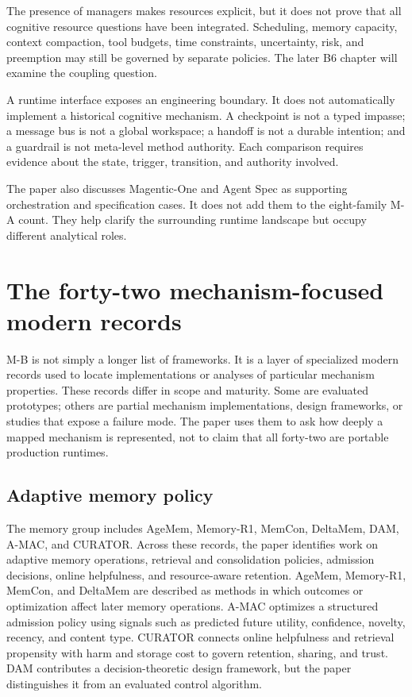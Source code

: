 The presence of managers makes resources explicit, but it does not prove that all cognitive resource questions have been integrated. Scheduling, memory capacity, context compaction, tool budgets, time constraints, uncertainty, risk, and preemption may still be governed by separate policies. The later B6 chapter will examine the coupling question.

\begin{warningbox}
A runtime interface exposes an engineering boundary. It does not automatically implement a historical cognitive mechanism. A checkpoint is not a typed impasse; a message bus is not a global workspace; a handoff is not a durable intention; and a guardrail is not meta-level method authority. Each comparison requires evidence about the state, trigger, transition, and authority involved.
\end{warningbox}

The paper also discusses Magentic-One and Agent Spec as supporting orchestration and specification cases. It does not add them to the eight-family M-A count. They help clarify the surrounding runtime landscape but occupy different analytical roles.

\section{The forty-two mechanism-focused modern records}
\label{sec:ch11-mechanism-records}

M-B is not simply a longer list of frameworks. It is a layer of specialized modern records used to locate implementations or analyses of particular mechanism properties. These records differ in scope and maturity. Some are evaluated prototypes; others are partial mechanism implementations, design frameworks, or studies that expose a failure mode. The paper uses them to ask how deeply a mapped mechanism is represented, not to claim that all forty-two are portable production runtimes.

\subsection{Adaptive memory policy}

The memory group includes AgeMem, Memory-R1, MemCon, DeltaMem, DAM, A-MAC, and CURATOR. Across these records, the paper identifies work on adaptive memory operations, retrieval and consolidation policies, admission decisions, online helpfulness, and resource-aware retention. AgeMem, Memory-R1, MemCon, and DeltaMem are described as methods in which outcomes or optimization affect later memory operations. A-MAC optimizes a structured admission policy using signals such as predicted future utility, confidence, novelty, recency, and content type. CURATOR connects online helpfulness and retrieval propensity with harm and storage cost to govern retention, sharing, and trust. DAM contributes a decision-theoretic design framework, but the paper distinguishes it from an evaluated control algorithm.

